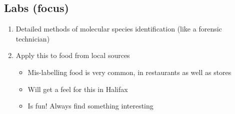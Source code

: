 \documentclass[hidelinks]{article}
\begin{document}
	\subsection{Labs (focus)}
		\begin{enumerate}
			\item Detailed methods of molecular species identification (like a forensic technician)
			\item Apply this to food from local sources
				\begin{itemize}
					\item Mis-labelling food is very common, in restaurants as well as stores
					\item Will get a feel for this in Halifax
					\item Is fun! Always find something interesting
				\end{itemize}
		\end{enumerate}
\end{document}
